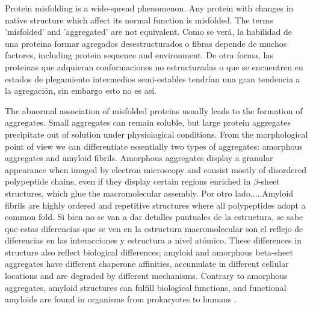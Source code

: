 Protein misfolding is a wide-spread phenomenon. Any protein with changes in native structure which affect its normal function is misfolded. 
The terms 'misfolded' and 'aggregated' are not equivalent. Como se verá, la habilidad de una proteina formar agregados desestructurados o fibras depende de muchos factores, including protein sequence and environment.
De otra forma, las proteinas que adquieran conformaciones no estructuradas o que se encuentren en estados de plegamiento intermedios semi-estables tendrían una gran tendencia a la agregación, sin embargo esto no es así. 









The abnormal association of misfolded proteins usually leads to the formation of aggregates. 
Small aggregates can remain soluble, but large protein aggregates precipitate out of solution under physiological conditions. 
From the morphological point of view we can differentiate essentially two types of aggregates: amorphous aggregates and amyloid fibrils. 
Amorphous aggregates display a granular appearance when imaged by electron microscopy and consist mostly of disordered polypeptide chains, even if they
display certain regions enriched in $\beta$-sheet structures, which glue the macromolecular assembly.
Por otro lado.....Amyloid fibrils are highly ordered and repetitive structures where all polypeptides adopt a common fold.
Si bien no se van a dar detalles puntuales de la estructura, se sabe que estas diferencias que se ven en la estructura macromolecular son el reflejo de diferencias en las interacciones y estructura a nivel atómico.
These differences in structure also reflect biological differences; amyloid and amorphous beta-sheet aggregates have different chaperone affinities, accumulate in different cellular locations and are degraded by different mechanisms.
Contrary to amorphous aggregates, amyloid structures can fulfill biological functions, and functional amyloids are found in organisms from prokaryotes to humans \cite{fowler2007functional}.



